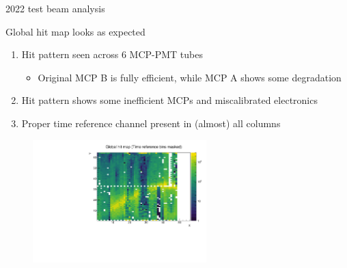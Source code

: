 \documentclass[xcolor={dvipsnames}]{beamer}
\begin{document}
\begin{frame}{2022 test beam analysis}
  \vspace{0.0cm}
  \begin{center}
    {\large Global hit map looks as expected}
  \end{center}
  \begin{enumerate}
    \setlength\itemsep{0.5em}
    \item{Hit pattern seen across 6 MCP-PMT tubes}
    \begin{itemize}
      \item{Original MCP B is fully efficient, while MCP A shows some degradation}
    \end{itemize}
    \item{Hit pattern shows some inefficient MCPs and miscalibrated electronics}
    \item{Proper time reference channel present in (almost) all columns}
  \end{enumerate}
  \vspace{0.01cm}
  \begin{figure}
    \centering
    \includegraphics[width = 0.6\textwidth]{Figs/GlobalHitMap_Run480.pdf}
  \end{figure}
\end{frame}
\end{document}
